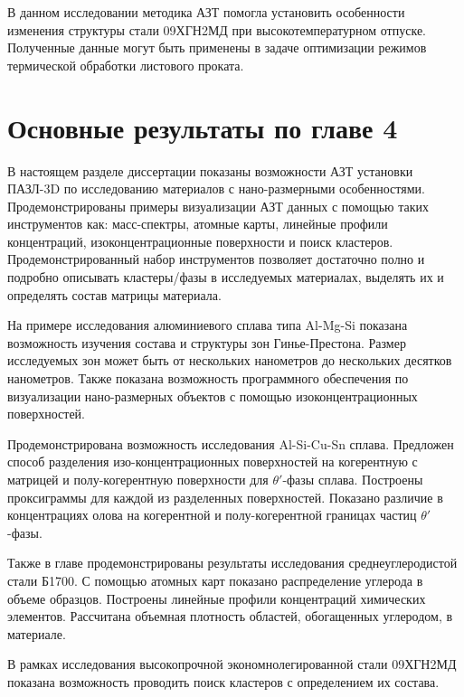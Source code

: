 В данном исследовании методика АЗТ помогла установить особенности изменения структуры стали 09ХГН2МД при высокотемпературном отпуске. Полученные данные могут быть применены в задаче оптимизации режимов термической обработки листового проката.


\FloatBarrier

\clearpage
\section{Основные результаты по главе 4}\label{sec:ch4/sect5}


В настоящем разделе диссертации показаны возможности АЗТ установки ПАЗЛ-3D по исследованию материалов с нано-размерными особенностями. Продемонстрированы примеры визуализации АЗТ данных с помощью таких инструментов как: масс-спектры, атомные карты, линейные профили концентраций, изоконцентрационные поверхности и поиск кластеров. Продемонстрированный набор инструментов позволяет достаточно полно и подробно описывать кластеры/фазы в исследуемых материалах, выделять их и определять состав матрицы материала.

На примере исследования алюминиевого сплава типа Al-Mg-Si показана возможность изучения состава и структуры зон Гинье-Престона. Размер исследуемых зон может быть от нескольких нанометров до нескольких десятков нанометров. Также показана возможность программного обеспечения по визуализации нано-размерных объектов с помощью изоконцентрационных поверхностей.

Продемонстрирована возможность исследования Al-Si-Cu-Sn сплава. Предложен способ разделения изо-концентрационных поверхностей на когерентную с матрицей и полу-когерентную поверхности для $\theta '$-фазы сплава. Построены проксиграммы для каждой из разделенных поверхностей. Показано различие в концентрациях олова на когерентной и полу-когерентной границах частиц $\theta '$-фазы.

Также в главе продемонстрированы результаты исследования среднеуглеродистой стали Б1700. С помощью атомных карт показано распределение углерода в объеме образцов. Построены линейные профили концентраций химических элементов. Рассчитана объемная плотность областей, обогащенных углеродом, в материале.

В рамках исследования высокопрочной экономнолегированной стали 09ХГН2МД показана возможность проводить поиск кластеров с определением их состава.






\FloatBarrier
\clearpage



















